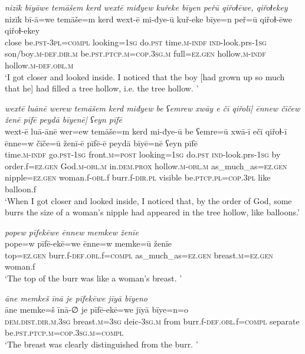 \ea \label{ZQ.38}
\textit{nizīk bīyāwe temāšem kerd wextē miđyew kuřeke bīyen peřū qiřoɫēwe, qiřoɫekey} \\ 
\gll nizīk bī-ā=we temāše=m kerd wext-ē mi-đye-ū kuř-eke bīye=n peř=ū qiřoɫ-ēwe qiřoɫ-ekey \\ 
 close be\textsc{.pst}\textsc{-3pl}\textsc{=compl} looking\textsc{=\textsc{1sg}} do\textsc{.pst} time\textsc{.m}\textsc{-indf} \textsc{ind-}look.prs\textsc{-\textsc{1sg}} son/boy\textsc{.m}\textsc{-def}\textsc{.dir}\textsc{.m} be\textsc{.pst}\textsc{.ptcp}\textsc{.m}\textsc{=cop}\textsc{.3sg}\textsc{.m} full\textsc{=ez.gen} hollow\textsc{.m}\textsc{-indf} hollow\textsc{.m}\textsc{-def}\textsc{.obl}\textsc{.m} \\ 
\glt `I got closer and looked inside. I noticed that the boy [had grown up so much that he] had filled a tree hollow, i.e. the tree hollow. '
\z 
 
\ea \label{ZQ.39}
\textit{wextē luānē werew temāšem kerd miđyew be ʕemrew xwāy e čī qiřolī| ēnnew čīčew ženē pīfē peydā bīyenē| ʕeyn pīfē} \\ 
\gll wext-ē luā-ānē wer=ew temāše=m kerd mi-đye-ū be ʕemre=ū xwā-ī ečī qiřoɫ-ī ēnne=w čīče=ū ženī-ē pīfē-ē peydā bīyē=nē ʕeyn pīfē \\ 
 time\textsc{.m}\textsc{-indf} go\textsc{.pst}\textsc{-\textsc{1sg}} front\textsc{.m}\textsc{=\textsc{post}} looking\textsc{=\textsc{1sg}} do\textsc{.pst} \textsc{ind-}look.prs\textsc{-\textsc{1sg}} by order.f\textsc{=ez.gen} God\textsc{.m}\textsc{-obl}\textsc{.m} in.\textsc{dem.prox} hollow\textsc{.m}\textsc{-obl}\textsc{.m} as\_much\_as\textsc{=ez.gen} nipple\textsc{=ez.gen} woman.f\textsc{-obl}.f burr.f\textsc{-dir}\textsc{.pl} visible be\textsc{.ptcp}\textsc{.pl}\textsc{=cop}\textsc{.3pl} like balloon.f \\ 
\glt `When I got closer and looked inside, I noticed that, by the order of God, some burrs the size of a woman's nipple had appeared in the tree hollow, like balloons.'
\z 
 
\ea \label{ZQ.40}
\textit{popew pīfekēwe ēnnew memkew ženīe} \\ 
\gll pope=w pīfē-ekē=we ēnne=w memke=ū ženīe \\ 
 top\textsc{=ez.gen} burr.f\textsc{-def}\textsc{.obl}.f\textsc{=compl} as\_much\_as\textsc{=ez.gen} breast\textsc{.m}\textsc{=ez.gen} woman.f \\ 
\glt `The top of the burr was like a woman’s breast. '
\z 
 
\ea \label{ZQ.41}
\textit{āne memkeš īnā je pīfekēwe jīyā bīyeno} \\ 
\gll āne memke=š īnā-∅ je pīfē-ekē=we jīyā bīye=n=o \\ 
 \textsc{dem.dist}\textsc{.dir}\textsc{.m}\textsc{.3sg} breast\textsc{.m}\textsc{=3sg} deic\textsc{-3sg}\textsc{.m} from burr.f\textsc{-def}\textsc{.obl}.f\textsc{=compl} separate be\textsc{.pst}\textsc{.ptcp}\textsc{.m}\textsc{=cop}\textsc{.3sg}\textsc{.m}\textsc{=compl} \\ 
\glt `The breast was clearly distinguished from the burr. '
\z 
 
